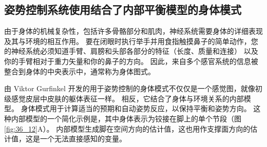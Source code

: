 \subsection{姿势控制系统使用结合了内部平衡模型的身体模式}

由于身体的机械复杂性，包括许多骨骼部分和肌肉，神经系统需要身体的详细表现及其与环境的相互作用。
要在闭眼时执行举手并用食指触摸鼻子的简单动作，您的神经系统必须知道手臂、肩膀和头部各部分的特征（长度、质量和连接） 以及你的手臂相对于重力矢量和你的鼻子的方向。
因此，来自多个感官系统的信息被整合到身体的中央表示中，通常称为身体图式。


由 Viktor Gurfinkel 开发的用于姿势控制的身体模式不仅仅是一个感觉图，就像初级感觉皮层中皮肤的躯体表征一样。
相反，它结合了身体与环境关系的内部模型。
身体模式用于计算适当的预期和自动姿势反应，以保持平衡和姿势方向。
这种内部模型的一个简化示例是，其中身体表示为铰接在脚上的单个节段（图 \ref{fig:36_12}A）。
内部模型生成脚在空间方向的估计值，这也用作支撑面方向的估计值，这是一个无法直接感知的变量。


